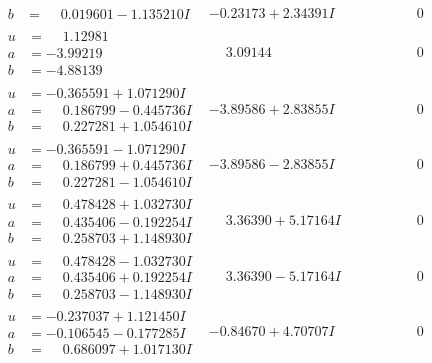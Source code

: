 \documentclass[1p]{elsarticle_modified}
\theoremstyle{definition}
\begin{document}
$$\begin{array}{c|c|c}
\begin{aligned}
b &= \phantom{-}0.019601 - 1.135210 I\end{aligned}
 & -0.23173 + 2.34391 I & \phantom{-0.000000 } 0 \\ \hline\begin{aligned}
u &= \phantom{-}1.12981\phantom{ +0.000000I} \\
a &= -3.99219\phantom{ +0.000000I} \\
b &= -4.88139\phantom{ +0.000000I}\end{aligned}
 & \phantom{-}3.09144\phantom{ +0.000000I} & \phantom{-0.000000 } 0 \\ \hline\begin{aligned}
u &= -0.365591 + 1.071290 I \\
a &= \phantom{-}0.186799 - 0.445736 I \\
b &= \phantom{-}0.227281 + 1.054610 I\end{aligned}
 & -3.89586 + 2.83855 I & \phantom{-0.000000 } 0 \\ \hline\begin{aligned}
u &= -0.365591 - 1.071290 I \\
a &= \phantom{-}0.186799 + 0.445736 I \\
b &= \phantom{-}0.227281 - 1.054610 I\end{aligned}
 & -3.89586 - 2.83855 I & \phantom{-0.000000 } 0 \\ \hline\begin{aligned}
u &= \phantom{-}0.478428 + 1.032730 I \\
a &= \phantom{-}0.435406 - 0.192254 I \\
b &= \phantom{-}0.258703 + 1.148930 I\end{aligned}
 & \phantom{-}3.36390 + 5.17164 I & \phantom{-0.000000 } 0 \\ \hline\begin{aligned}
u &= \phantom{-}0.478428 - 1.032730 I \\
a &= \phantom{-}0.435406 + 0.192254 I \\
b &= \phantom{-}0.258703 - 1.148930 I\end{aligned}
 & \phantom{-}3.36390 - 5.17164 I & \phantom{-0.000000 } 0 \\ \hline\begin{aligned}
u &= -0.237037 + 1.121450 I \\
a &= -0.106545 - 0.177285 I \\
b &= \phantom{-}0.686097 + 1.017130 I\end{aligned}
 & -0.84670 + 4.70707 I & \phantom{-0.000000 } 0\\

\end{array}$$
\end{document}

